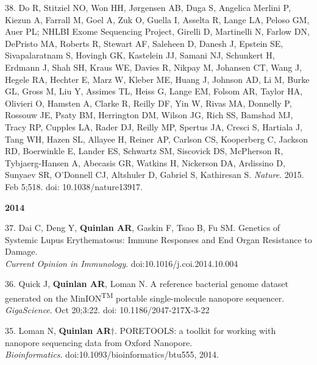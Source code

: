 \documentclass[margin,line]{cv}
\begin{document}
\begin{resume}
\begin{list}{*}{}
    \item[38.] Do R, Stitziel NO, Won HH, Jørgensen AB, Duga S, Angelica Merlini P, Kiezun A, Farrall M, Goel A, Zuk O, Guella I, Asselta R, Lange LA, Peloso GM, Auer PL; NHLBI Exome Sequencing Project, Girelli D, Martinelli N, Farlow DN, DePristo MA, Roberts R, Stewart AF, Saleheen D, Danesh J, Epstein SE, Sivapalaratnam S, Hovingh GK, Kastelein JJ, Samani NJ, Schunkert H, Erdmann J, Shah SH, Kraus WE, Davies R, Nikpay M, Johansen CT, Wang J, Hegele RA, Hechter E, Marz W, Kleber ME, Huang J, Johnson AD, Li M, Burke GL, Gross M, Liu Y, Assimes TL, Heiss G, Lange EM, Folsom AR, Taylor HA, Olivieri O, Hamsten A, Clarke R, Reilly DF, Yin W, Rivas MA, Donnelly P, Rossouw JE, Psaty BM, Herrington DM, Wilson JG, Rich SS, Bamshad MJ, Tracy RP, Cupples LA, Rader DJ, Reilly MP, Spertus JA, Cresci S, Hartiala J, Tang WH, Hazen SL, Allayee H, Reiner AP, Carlson CS, Kooperberg C, Jackson RD, Boerwinkle E, Lander ES, Schwartz SM, Siscovick DS, McPherson R, Tybjaerg-Hansen A, Abecasis GR, Watkins H, Nickerson DA, Ardissino D, Sunyaev SR, O'Donnell CJ, Altshuler D, Gabriel S, Kathiresan S.
    \emph{Nature}. 2015. Feb 5;518. doi: 10.1038/nature13917.

    \end{list}


    \textbf{2014} \\

    \begin{list}{*}{}

    \item[37.] Dai C, Deng Y, \textbf{Quinlan AR}, Gaskin F, Tsao B, Fu SM.
    Genetics of Systemic Lupus Erythematosus: Immune Responses and End Organ Resistance to Damage.\\
    \emph{Current Opinion in Immunology}. doi:10.1016/j.coi.2014.10.004

    \item[36.] Quick J, \textbf{Quinlan AR}, Loman N.
    A reference bacterial genome dataset generated on the MinION\textsuperscript{TM} portable single-molecule nanopore sequencer.\\
    \emph{GigaScience}. Oct 20;3:22. doi: 10.1186/2047-217X-3-22

    \item[35.] Loman N, \textbf{Quinlan AR}$\dagger$.
    PORETOOLS: a toolkit for working with nanopore sequencing data from Oxford Nanopore.\\
    \emph{Bioinformatics}. doi:10.1093/bioinformatics/btu555, 2014.


\end{list}
\end{resume}
\end{document}
